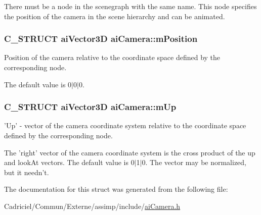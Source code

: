 There must be a node in the scenegraph with the same name. This node specifies the position of the camera in the scene hierarchy and can be animated. \hypertarget{structai_camera_a518617ea192ca0698e748a4399e7c3a5}{
\subsubsection[{m\-Position}]{\setlength{\rightskip}{0pt plus 5cm}C\-\_\-\-S\-T\-R\-U\-C\-T {\bf ai\-Vector3\-D} ai\-Camera\-::m\-Position}}\label{structai_camera_a518617ea192ca0698e748a4399e7c3a5}
Position of the camera relative to the coordinate space defined by the corresponding node.

The default value is 0$\vert$0$\vert$0. \hypertarget{structai_camera_a7fb42b287389b4f99c883098268d6d1a}{
\subsubsection[{m\-Up}]{\setlength{\rightskip}{0pt plus 5cm}C\-\_\-\-S\-T\-R\-U\-C\-T {\bf ai\-Vector3\-D} ai\-Camera\-::m\-Up}}\label{structai_camera_a7fb42b287389b4f99c883098268d6d1a}
'Up' -\/ vector of the camera coordinate system relative to the coordinate space defined by the corresponding node.

The 'right' vector of the camera coordinate system is the cross product of the up and look\-At vectors. The default value is 0$\vert$1$\vert$0. The vector may be normalized, but it needn't. 

The documentation for this struct was generated from the following file\-:\begin{DoxyCompactItemize}
\item 
Cadriciel/\-Commun/\-Externe/assimp/include/\hyperlink{ai_camera_8h}{ai\-Camera.\-h}\end{DoxyCompactItemize}
